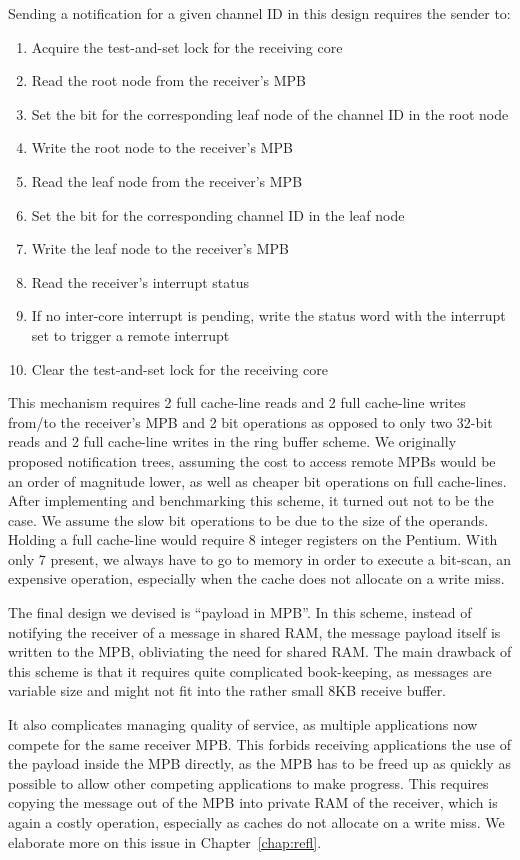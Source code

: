 \documentclass[a4paper,twoside]{report} %
\begin{document}
Sending a notification for a given channel ID in this design requires
the sender to:

\begin{enumerate}
\item Acquire the test-and-set lock for the receiving core
\item Read the root node from the receiver's MPB
\item Set the bit for the corresponding leaf node of the channel ID
  in the root node
\item Write the root node to the receiver's MPB
\item Read the leaf node from the receiver's MPB
\item Set the bit for the corresponding channel ID in the leaf node
\item Write the leaf node to the receiver's MPB
   \item Read the receiver's interrupt status
   \item If no inter-core interrupt is pending, write the status word
     with the interrupt set to trigger a remote interrupt
\item Clear the test-and-set lock for the receiving core
\end{enumerate}

This mechanism requires 2 full cache-line reads and 2 full cache-line
writes from/to the receiver's MPB and 2 bit operations as opposed to
only two 32-bit reads and 2 full cache-line writes in the ring buffer
scheme. We originally proposed notification trees, assuming the cost
to access remote MPBs would be an order of magnitude lower, as well as
cheaper bit operations on full cache-lines. After implementing and
benchmarking this scheme, it turned out not to be the case. We assume
the slow bit operations to be due to the size of the operands. Holding
a full cache-line would require 8 integer registers on the Pentium.
With only 7 present, we always have to go to memory in order to
execute a bit-scan, an expensive operation, especially when the cache
does not allocate on a write miss.

The final design we devised is ``payload in MPB''. In this scheme,
instead of notifying the receiver of a message in shared RAM, the
message payload itself is written to the MPB, obliviating the need for
shared RAM. The main drawback of this scheme is that it requires quite
complicated book-keeping, as messages are variable size and might not
fit into the rather small 8KB receive buffer.

It also complicates managing quality of service, as multiple
applications now compete for the same receiver MPB. This forbids
receiving applications the use of the payload inside the MPB directly,
as the MPB has to be freed up as quickly as possible to allow other
competing applications to make progress. This requires copying the
message out of the MPB into private RAM of the receiver, which is
again a costly operation, especially as caches do not allocate on a
write miss. We elaborate more on this issue in
Chapter~\ref{chap:refl}.
\end{document}
